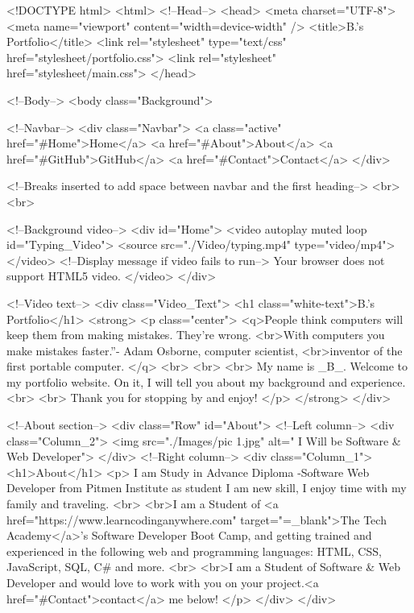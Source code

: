 <!DOCTYPE html>
<html>
    <!--Head-->
    <head>
        <meta charset="UTF-8">
        <meta name="viewport" content="width=device-width" />
        <title>B.'s Portfolio</title>
        <link rel="stylesheet" type="text/css" href="stylesheet/portfolio.css">
        <link rel="stylesheet" href="stylesheet/main.css">
    </head>

    <!--Body-->
    <body class="Background">
        
        <!--Navbar-->
        <div class="Navbar">
            <a class="active" href="#Home">Home</a>
            <a href="#About">About</a>
            <a href="#GitHub">GitHub</a>
            <a href="#Contact">Contact</a>
        </div>

        <!--Breaks inserted to add space between navbar and the first heading-->
        <br>
        <br>

        <!--Background video-->
        <div id="Home">
            <video autoplay muted loop id="Typing_Video">
                <source src="./Video/typing.mp4" type="video/mp4"></video>
                <!--Display message if video fails to run-->
                Your browser does not support HTML5 video.
            </video>
        </div>

         <!--Video text-->
         <div class="Video_Text">
            <h1 class="white-text">B.'s Portfolio</h1>
            <strong>
                <p class="center">
                    <q>People think computers will keep them from making mistakes. They’re wrong.
                        <br>With computers you make mistakes faster.”- Adam Osborne, computer scientist,
                        <br>inventor of the first portable computer.
                    </q>
                    <br> 
                    <br>
                    <br> My name is _B_. Welcome to my portfolio website. On it, I will tell you about my background and experience.
                    <br>
                    <br> Thank you for stopping by and enjoy! 
                </p>
            </strong>
        </div>

        <!--About section-->
        <div class="Row" id="About">
            <!--Left column-->
            <div class="Column_2">
                <img src="./Images/pic 1.jpg" alt="  I Will be Software & Web Developer">
            </div>
            <!--Right column-->
            <div class="Column_1">
                <h1>About</h1>
                <p>
                    I am Study in Advance Diploma -Software Web Developer from Pitmen Institute as student I am new skill, I enjoy time with my family and traveling.
                    <br>
                    <br>I am a Student of <a href="https://www.learncodinganywhere.com" target="=_blank">The Tech Academy</a>'s Software Developer Boot Camp, and getting trained and experienced in the following web and programming languages: HTML, CSS, JavaScript, SQL, C# and more.
                    <br>
                    <br>I am a Student of Software & Web Developer and would love to work with you on your project.<a href="#Contact">contact</a> me below!
                    </p>
                    </div>
                    </div>

